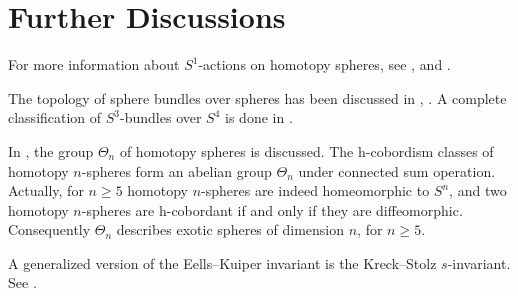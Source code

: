 \documentclass[twoside]{article}
\begin{document}
\section{Further Discussions}

For more information about $S^1$-actions on homotopy spheres, see \cite{hsiang}, \cite{my} and  \cite{rs}.  


The topology of sphere bundles over spheres has been discussed in \cite{james1}, \cite{james2}. A complete classification of
$S^3$-bundles over $S^4$ is done in \cite{crowley}. 

In \cite{kervairemilnor}, the group $\Theta_n$ of homotopy  spheres is discussed. The h-cobordism classes of homotopy $n$-spheres form an abelian group $\Theta_n$ under connected sum operation. Actually, for $n \geq  5$ homotopy $n$-spheres are indeed homeomorphic to $S^n$, and two homotopy $n$-spheres are h-cobordant if and only if they are diffeomorphic. Consequently $\Theta_n$ describes exotic spheres of dimension $n$, for $n \geq  5$. 

A generalized version of the Eells--Kuiper invariant is the Kreck--Stolz $s$-invariant. See \cite{moduli}. 





\nocite{*}

\printbibliography
\end{document}
